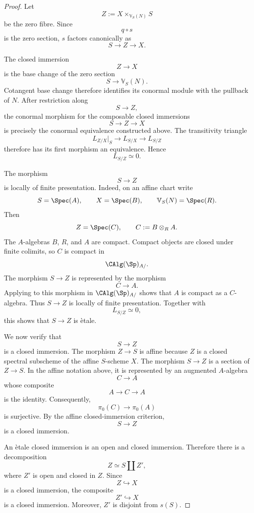 \begin{proof}
Let
\[
    Z
    :=
    X
    \times_{\mathbb V_S(N)}
    S
\]
be the zero fibre. Since
\[
    q\circ s
\]
is the zero section, \(s\) factors canonically as
\[
    S
    \longrightarrow
    Z
    \longrightarrow
    X.
\]

The closed immersion
\[
    Z
    \longrightarrow
    X
\]
is the base change of the zero section
\[
    S
    \longrightarrow
    \mathbb V_S(N).
\]
Cotangent base change therefore identifies its conormal module with the
pullback of \(N\). After restriction along
\[
    S
    \longrightarrow
    Z,
\]
the conormal morphism for the composable closed immersions
\[
    S
    \longrightarrow
    Z
    \longrightarrow
    X
\]
is precisely the conormal equivalence constructed above. The
transitivity triangle
\[
    L_{Z/X}|_S
    \longrightarrow
    L_{S/X}
    \longrightarrow
    L_{S/Z}
\]
therefore has its first morphism an equivalence. Hence
\[
    L_{S/Z}
    \simeq
    0.
\]

The morphism
\[
    S
    \longrightarrow
    Z
\]
is locally of finite presentation. Indeed, on an affine chart write
\[
    S=\Spec(A),
    \qquad
    X=\Spec(B),
    \qquad
    \mathbb V_S(N)=\Spec(R).
\]
Then
\[
    Z
    =
    \Spec(C),
    \qquad
    C
    :=
    B\otimes_RA.
\]
The \(A\)-algebras \(B\), \(R\), and \(A\) are compact. Compact objects
are closed under finite colimits, so \(C\) is compact in
\[
    \CAlg(\Sp)_{A/}.
\]
The morphism \(S\to Z\) is represented by the morphism
\[
    C
    \longrightarrow
    A.
\]
Applying
to this morphism in
\(\CAlg(\Sp)_{A/}\) shows that \(A\) is compact as a \(C\)-algebra.
Thus \(S\to Z\) is locally of finite presentation. Together with
\[
    L_{S/Z}
    \simeq
    0,
\]
this shows that \(S\to Z\) is \`etale.

We now verify that
\[
    S
    \longrightarrow
    Z
\]
is a closed immersion. The morphism \(Z\to S\) is affine because \(Z\)
is a closed spectral subscheme of the affine \(S\)-scheme \(X\). The
morphism \(S\to Z\) is a section of \(Z\to S\). In the affine notation
above, it is represented by an augmented \(A\)-algebra
\[
    C
    \longrightarrow
    A
\]
whose composite
\[
    A
    \longrightarrow
    C
    \longrightarrow
    A
\]
is the identity. Consequently,
\[
    \pi_0(C)
    \longrightarrow
    \pi_0(A)
\]
is surjective. By the affine closed-immersion criterion,
\[
    S
    \longrightarrow
    Z
\]
is a closed immersion.

An \`etale closed immersion is an open and closed immersion. Therefore
there is a decomposition
\[
    Z
    \simeq
    S
    \coprod
    Z',
\]
where \(Z'\) is open and closed in \(Z\). Since
\[
    Z
    \hookrightarrow
    X
\]
is a closed immersion, the composite
\[
    Z'
    \hookrightarrow
    X
\]
is a closed immersion. Moreover, \(Z'\) is disjoint from \(s(S)\).


\end{proof}
